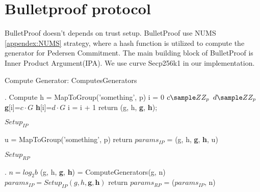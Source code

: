 \appendix


\section{Bulletproof protocol}
\label{appendix:bp}

BulletProof doesn't depends on trust setup. BulletProof use NUMS \ref{appendex:NUMS} strategy, where a hash function is utilized to compute the generator for Pedersen Commitment. The main building block of BulletProof is Inner Product Argument(IPA). We use curve Secp256k1 in our implementation.


\begin{algorithm}
 \DontPrintSemicolon
    \caption{Compute Generator: ComputesGenerators}
    \label{alg:ComputesGenerators}
    \LinesNumbered
    
    .
    Compute h = MapToGroup('something', p) \;
    i = 0 \;
     {
        $c \sample ZZ_p$ \;
        $d \sample ZZ_p$ \;
        \textbf{g}[i]=$c\cdot G$ \;
        \textbf{h}[i]=$d\cdot G$ \;
        i = i + 1\;
    }
    return (g, h, \textbf{g}, \textbf{h});
\end{algorithm}

\begin{algorithm}
 \DontPrintSemicolon
    \caption{$Setup_{IP}$}
    \label{alg:setup_ip}
    \LinesNumbered
    
    
    u = MapToGroup('something', p) \;
    return $params_{IP}$ = (g, h, \textbf{g}, \textbf{h}, u)
\end{algorithm}

\begin{algorithm}
 \DontPrintSemicolon
    \caption{$Setup_{RP}$}
    \label{alg:setup_rp}
    \LinesNumbered
    
    \KwIn{the input interval [a, b), and the field modulus p}.
     {
        $n = log_2b$ \;
        (g, h, \textbf{g}, \textbf{h}) = ComputeGenerators(g, n) \;
        $params_{IP} = Setup_{IP}(g, h, \textbf{g}, \textbf{h})$ \;
        return $params_{RP}$ = ($params_{IP}$, n) \;
    }
\end{algorithm}

